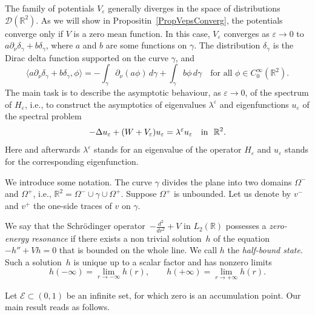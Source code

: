 \documentclass[reqno]{amsart}
\theoremstyle{plain}
\numberwithin{equation}{section}
\newcommand{\Real}{\mathbb R}
\newcommand{\eps}{\varepsilon}
\newcommand{\cE}{\mathcal{E}}
\renewcommand{\emph}[1]{{\textit{#1}}}
\newcommand{\npt}{\partial_\nu}
\begin{document}
The family of potentials $V_\eps$ generally diverges in the space of distributions $\mathcal{D}(\Real^2)$.
As we will show  in Propositin~\ref{PropVepsConverg},
the  potentials converge only if $V$ is a zero mean function. In this case,
$V_\eps$ converges as $\eps\to 0$ to $a\partial_\nu\delta_\gamma+b\delta_\gamma$, where $a$ and $b$ are some functions on $\gamma$. The  distribution $\delta_\gamma$ is the Dirac delta function supported on the curve $\gamma$, and
\begin{equation*}
  \langle a\partial_\nu\delta_\gamma+b \delta_\gamma, \phi \rangle= -\int_\gamma  \npt(a\phi)\,d\gamma+\int_\gamma b \phi\,d\gamma\quad\text{for all }\phi\in C^\infty_0(\Real^2).
\end{equation*}
The main task is to describe the  asymptotic behaviour, as $\eps\to 0$, of the spectrum  of $H_\eps$, i.e., to construct the asymptotics of eigenvalues $\lambda^\eps$ and eigenfunctions $u_\eps$ of the spectral problem
\begin{equation}\label{SpectralEqn}
-\Delta u_\eps +(W+V_\eps) u_\eps= \lambda^\eps u_\eps\quad \hbox{in \ } \Real^2.
\end{equation}
Here and afterwards $\lambda^\eps$ stands for an eigenvalue of the operator $H_\eps$ and $u_\eps$ stands for the corresponding eigenfunction.




We  introduce some notation. The curve $\gamma$ divides the plane into two domains $\Omega^-$ and $\Omega^+$, i.e., $\Real^2=\Omega^-\cup\gamma\cup\Omega^+$. Suppose  $\Omega^+$ is unbounded.
Let us denote by $v^-$ and $v^+$ the one-side traces of $v$ on $\gamma$.

We  say that the Schr\"odinger operator~$-\frac{d^2}{d r^2}+V$ in $L_2(\Real)$ possesses a \emph{zero-energy resonance}  if there exists a non trivial solution~$h$ of the equation $-h'' +Vh= 0$ that is bounded on the whole line.  We call $h$ the \emph{half-bound state}.  Such a solution~$h$ is  unique up to a scalar factor and has nonzero limits
\begin{equation*}
  h(-\infty)=\lim\limits_{r\to-\infty}h(r), \qquad
  h(+\infty)=\lim\limits_{r\to+\infty}h(r).
\end{equation*}

Let $\cE\subset(0, 1)$ be an infinite set, for which zero is an accumulation point.
Our main result reads as follows.
\end{document}
